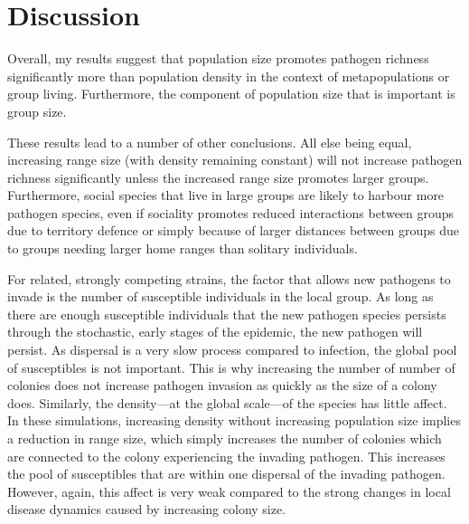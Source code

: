 \section{Discussion}



Overall, my results suggest that population size promotes pathogen richness significantly more than population density in the context of metapopulations or group living.
Furthermore, the component of population size that is important is group size.

These results lead to a number of other conclusions.
All else being equal, increasing range size (with density remaining constant) will not increase pathogen richness significantly unless the increased range size promotes larger groups.
Furthermore, social species that live in large groups are likely to harbour more pathogen species, even if sociality promotes reduced interactions between groups due to territory defence or simply because of larger distances between groups due to groups needing larger home ranges than solitary individuals.



For related, strongly competing strains, the factor that allows new pathogens to invade is the number of susceptible individuals in the local group.
As long as there are enough susceptible individuals that the new pathogen species persists through the stochastic, early stages of the epidemic, the new pathogen will persist.
As dispersal is a very slow process compared to infection, the global pool of susceptibles is not important. 
This is why increasing the number of number of colonies does not increase pathogen invasion as quickly as the size of a colony does.
Similarly, the density---at the global scale---of the species has little affect.
In these simulations, increasing density without increasing population size implies a reduction in range size, which simply increases the number of colonies which are connected to the colony experiencing the invading pathogen.
This increases the pool of susceptibles that are within one dispersal of the invading pathogen.
However, again, this affect is very weak compared to the strong changes in local disease dynamics caused by increasing colony size.



